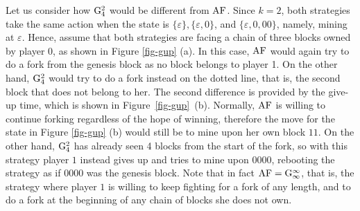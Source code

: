 \begin{example}
Let us consider how ${\rm {G}}_4^2$ would be different from $\text{\rm AF}$. Since $k = 2$, both strategies take the same action when the state is $\{\varepsilon\}, \{\varepsilon,0\}$, and $\{\varepsilon,0,00\}$, namely, mining at $\varepsilon$. Hence, assume that both strategies are facing a chain of three 
blocks owned by player 0, 
as shown in Figure \ref{fig-gup} (a). In this case, $\text{\rm AF}$ would again try to do a fork from the genesis block as no block belongs to player 1. On the other hand, ${\rm {G}}_4^2$ would try to do a fork instead on the dotted line, that is, the second block that does not belong to her.
The second difference is provided by the give-up time, which is shown in Figure~\ref{fig-gup}~(b). Normally, $\text{\rm AF}$ is willing to continue forking regardless of the hope of winning, therefore the move for the state in Figure \ref{fig-gup} (b) would still be to mine upon her own block $11$. On the other hand, ${\rm {G}}_4^2$ has already seen 4 blocks from the start of the fork, so with this strategy player $1$ instead gives up and tries to mine upon $0000$, rebooting the strategy as if 
$0000$ was the genesis block. Note that in fact $\text{\rm AF}={\rm {G}}_\infty^\infty$, that is, the strategy where player $1$ is willing to keep fighting for a fork of any length, and to do a fork at the beginning of any chain of blocks she does not own.  
\end{example}

